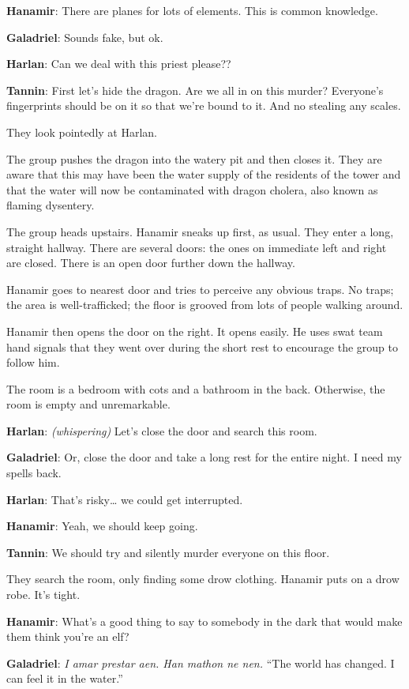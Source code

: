 \documentclass[smalldemyvopaper,11pt,twoside,onecolumn,openright,extrafontsizes]{memoir}
\begin{document}
\textbf{Hanamir}: There are planes for lots of elements. This is common
knowledge.

\textbf{Galadriel}: Sounds fake, but ok.

\textbf{Harlan}: Can we deal with this priest please??

\textbf{Tannin}: First let's hide the dragon. Are we all in on this
murder? Everyone's fingerprints should be on it so that we're bound to
it. And no stealing any scales.

They look pointedly at Harlan.

The group pushes the dragon into the watery pit and then closes it. They
are aware that this may have been the water supply of the residents of
the tower and that the water will now be contaminated with dragon
cholera, also known as flaming dysentery.

The group heads upstairs. Hanamir sneaks up first, as usual. They enter
a long, straight hallway. There are several doors: the ones on immediate
left and right are closed. There is an open door further down the
hallway.

Hanamir goes to nearest door and tries to perceive any obvious traps. No
traps; the area is well-trafficked; the floor is grooved from lots of
people walking around.

Hanamir then opens the door on the right. It opens easily. He uses swat
team hand signals that they went over during the short rest to encourage
the group to follow him.

The room is a bedroom with cots and a bathroom in the back. Otherwise,
the room is empty and unremarkable.

\textbf{Harlan}: \emph{(whispering)} Let's close the door and search
this room.

\textbf{Galadriel}: Or, close the door and take a long rest for the
entire night. I need my spells back.

\textbf{Harlan}: That's risky\ldots{} we could get interrupted.

\textbf{Hanamir}: Yeah, we should keep going.

\textbf{Tannin}: We should try and silently murder everyone on this
floor.

They search the room, only finding some drow clothing. Hanamir puts on a
drow robe. It's tight.

\textbf{Hanamir}: What's a good thing to say to somebody in the dark
that would make them think you're an elf?

\textbf{Galadriel}: \emph{I amar prestar aen. Han mathon ne nen.} ``The
world has changed. I can feel it in the water.''
\end{document}
